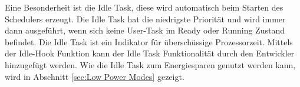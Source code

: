Eine Besonderheit ist die Idle Task, diese wird automatisch beim Starten des Schedulers erzeugt. Die Idle Task hat die niedrigste Priorität und wird immer dann ausgeführt, wenn sich keine User-Task im Ready oder Running Zustand befindet. Die Idle Task ist ein Indikator für überschüssige Prozessorzeit. Mittels der Idle-Hook Funktion kann der Idle Task Funktionalität durch den Entwickler hinzugefügt werden. Wie die Idle Task zum Energiesparen genutzt werden kann, wird in Abschnitt \ref{sec:Low Power Modes} gezeigt.

